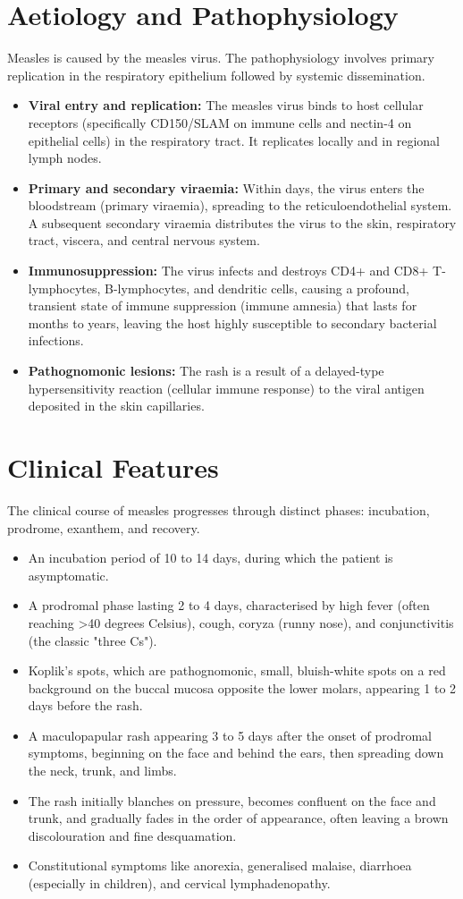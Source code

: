 \section*{Aetiology and Pathophysiology}
Measles is caused by the measles virus. The pathophysiology involves primary replication in the respiratory epithelium followed by systemic dissemination.
\begin{itemize}
    \item \textbf{Viral entry and replication:} The measles virus binds to host cellular receptors (specifically CD150/SLAM on immune cells and nectin-4 on epithelial cells) in the respiratory tract. It replicates locally and in regional lymph nodes.
    \item \textbf{Primary and secondary viraemia:} Within days, the virus enters the bloodstream (primary viraemia), spreading to the reticuloendothelial system. A subsequent secondary viraemia distributes the virus to the skin, respiratory tract, viscera, and central nervous system.
    \item \textbf{Immunosuppression:} The virus infects and destroys CD4+ and CD8+ T-lymphocytes, B-lymphocytes, and dendritic cells, causing a profound, transient state of immune suppression (immune amnesia) that lasts for months to years, leaving the host highly susceptible to secondary bacterial infections.
    \item \textbf{Pathognomonic lesions:} The rash is a result of a delayed-type hypersensitivity reaction (cellular immune response) to the viral antigen deposited in the skin capillaries.
\end{itemize}

\section*{Clinical Features}
The clinical course of measles progresses through distinct phases: incubation, prodrome, exanthem, and recovery.
\begin{itemize}
    \item An incubation period of 10 to 14 days, during which the patient is asymptomatic.
    \item A prodromal phase lasting 2 to 4 days, characterised by high fever (often reaching >40 degrees Celsius), cough, coryza (runny nose), and conjunctivitis (the classic "three Cs").
    \item Koplik's spots, which are pathognomonic, small, bluish-white spots on a red background on the buccal mucosa opposite the lower molars, appearing 1 to 2 days before the rash.
    \item A maculopapular rash appearing 3 to 5 days after the onset of prodromal symptoms, beginning on the face and behind the ears, then spreading down the neck, trunk, and limbs.
    \item The rash initially blanches on pressure, becomes confluent on the face and trunk, and gradually fades in the order of appearance, often leaving a brown discolouration and fine desquamation.
    \item Constitutional symptoms like anorexia, generalised malaise, diarrhoea (especially in children), and cervical lymphadenopathy.
\end{itemize}

